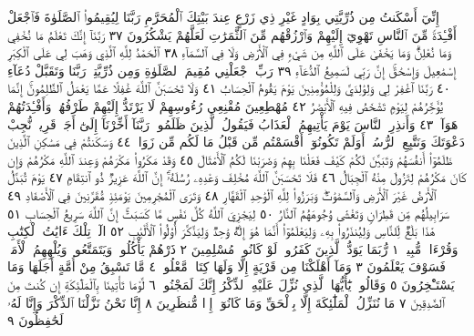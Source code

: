 إِنِّيٓ أَسْكَنتُ مِن ذُرِّيَّتِي بِوَادٍ غَيْرِ ذِي زَرْعٍ عِندَ بَيْتِكَ
ٱلْمُحَرَّمِ رَبَّنَا لِيُقِيمُوا۟ ٱلصَّلَوٰةَ فَٱجْعَلْ أَفْـِٔدَةࣰ مِّنَ ٱلنَّاسِ
تَهْوِيٓ إِلَيْهِمْ وَٱرْزُقْهُم مِّنَ ٱلثَّمَرَٰتِ لَعَلَّهُمْ يَشْكُرُونَ ٣٧
رَبَّنَآ إِنَّكَ تَعْلَمُ مَا نُخْفِي وَمَا نُعْلِنُۗ وَمَا يَخْفَىٰ عَلَى ٱللَّهِ
مِن شَيْءࣲ فِي ٱلْأَرْضِ وَلَا فِي ٱلسَّمَآءِ ٣٨ ٱلْحَمْدُ لِلَّهِ ٱلَّذِي
وَهَبَ لِي عَلَى ٱلْكِبَرِ إِسْمَٰعِيلَ وَإِسْحَٰقَۚ إِنَّ رَبِّي لَسَمِيعُ
ٱلدُّعَآءِ ٣٩ رَبِّ ٱجْعَلْنِي مُقِيمَ ٱلصَّلَوٰةِ وَمِن ذُرِّيَّتِيۚ رَبَّنَا
وَتَقَبَّلْ دُعَآءِ ٤٠ رَبَّنَا ٱغْفِرْ لِي وَلِوَٰلِدَيَّ وَلِلْمُؤْمِنِينَ
يَوْمَ يَقُومُ ٱلْحِسَابُ ٤١ وَلَا تَحْسَبَنَّ ٱللَّهَ غَٰفِلًا عَمَّا يَعْمَلُ
ٱلظَّٰلِمُونَۚ إِنَّمَا يُؤَخِّرُهُمْ لِيَوْمࣲ تَشْخَصُ فِيهِ ٱلْأَبْصَٰرُ ٤٢
مُهْطِعِينَ مُقْنِعِي رُءُوسِهِمْ لَا يَرْتَدُّ إِلَيْهِمْ طَرْفُهُمْۖ
وَأَفْـِٔدَتُهُمْ هَوَآءࣱ ٤٣ وَأَنذِرِ ٱلنَّاسَ يَوْمَ يَأْتِيهِمُ ٱلْعَذَابُ
فَيَقُولُ ٱلَّذِينَ ظَلَمُوا۟ رَبَّنَآ أَخِّرْنَآ إِلَىٰٓ أَجَلࣲ قَرِيبࣲ نُّجِبْ
دَعْوَتَكَ وَنَتَّبِعِ ٱلرُّسُلَۗ أَوَلَمْ تَكُونُوٓا۟ أَقْسَمْتُم مِّن قَبْلُ
مَا لَكُم مِّن زَوَالࣲ ٤٤ وَسَكَنتُمْ فِي مَسَٰكِنِ ٱلَّذِينَ ظَلَمُوٓا۟
أَنفُسَهُمْ وَتَبَيَّنَ لَكُمْ كَيْفَ فَعَلْنَا بِهِمْ وَضَرَبْنَا لَكُمُ
ٱلْأَمْثَالَ ٤٥ وَقَدْ مَكَرُوا۟ مَكْرَهُمْ وَعِندَ ٱللَّهِ مَكْرُهُمْ
وَإِن كَانَ مَكْرُهُمْ لِتَزُولَ مِنْهُ ٱلْجِبَالُ ٤٦ فَلَا
تَحْسَبَنَّ ٱللَّهَ مُخْلِفَ وَعْدِهِۦ رُسُلَهُۥٓۚ إِنَّ ٱللَّهَ عَزِيزࣱ
ذُو ٱنتِقَامࣲ ٤٧ يَوْمَ تُبَدَّلُ ٱلْأَرْضُ غَيْرَ ٱلْأَرْضِ وَٱلسَّمَٰوَٰتُۖ
وَبَرَزُوا۟ لِلَّهِ ٱلْوَٰحِدِ ٱلْقَهَّارِ ٤٨ وَتَرَى ٱلْمُجْرِمِينَ يَوْمَئِذࣲ
مُّقَرَّنِينَ فِي ٱلْأَصْفَادِ ٤٩ سَرَابِيلُهُم مِّن قَطِرَانࣲ وَتَغْشَىٰ
وُجُوهَهُمُ ٱلنَّارُ ٥٠ لِيَجْزِيَ ٱللَّهُ كُلَّ نَفْسࣲ مَّا كَسَبَتْۚ
إِنَّ ٱللَّهَ سَرِيعُ ٱلْحِسَابِ ٥١ هَٰذَا بَلَٰغࣱ لِّلنَّاسِ وَلِيُنذَرُوا۟ بِهِۦ
وَلِيَعْلَمُوٓا۟ أَنَّمَا هُوَ إِلَٰهࣱ وَٰحِدࣱ وَلِيَذَّكَّرَ أُو۟لُوا۟ ٱلْأَلْبَٰبِ ٥٢
الٓرۚ تِلْكَ ءَايَٰتُ ٱلْكِتَٰبِ وَقُرْءَانࣲ مُّبِينࣲ ١ رُّبَمَا يَوَدُّ
ٱلَّذِينَ كَفَرُوا۟ لَوْ كَانُوا۟ مُسْلِمِينَ ٢ ذَرْهُمْ يَأْكُلُوا۟
وَيَتَمَتَّعُوا۟ وَيُلْهِهِمُ ٱلْأَمَلُۖ فَسَوْفَ يَعْلَمُونَ ٣ وَمَآ أَهْلَكْنَا
مِن قَرْيَةٍ إِلَّا وَلَهَا كِتَابࣱ مَّعْلُومࣱ ٤ مَّا تَسْبِقُ مِنْ أُمَّةٍ
أَجَلَهَا وَمَا يَسْتَـْٔخِرُونَ ٥ وَقَالُوا۟ يَٰٓأَيُّهَا ٱلَّذِي نُزِّلَ عَلَيْهِ
ٱلذِّكْرُ إِنَّكَ لَمَجْنُونࣱ ٦ لَّوْمَا تَأْتِينَا بِٱلْمَلَٰٓئِكَةِ إِن كُنتَ
مِنَ ٱلصَّٰدِقِينَ ٧ مَا نُنَزِّلُ ٱلْمَلَٰٓئِكَةَ إِلَّا بِٱلْحَقِّ وَمَا كَانُوٓا۟
إِذࣰا مُّنظَرِينَ ٨ إِنَّا نَحْنُ نَزَّلْنَا ٱلذِّكْرَ وَإِنَّا لَهُۥ لَحَٰفِظُونَ ٩
